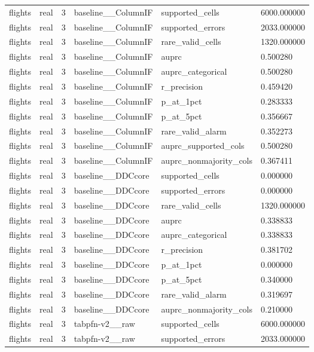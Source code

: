 \begin{tabular}{llllll}
flights & real & 3 & baseline\_\_ColumnIF & supported\_cells & 6000.000000 \\
flights & real & 3 & baseline\_\_ColumnIF & supported\_errors & 2033.000000 \\
flights & real & 3 & baseline\_\_ColumnIF & rare\_valid\_cells & 1320.000000 \\
flights & real & 3 & baseline\_\_ColumnIF & auprc & 0.500280 \\
flights & real & 3 & baseline\_\_ColumnIF & auprc\_categorical & 0.500280 \\
flights & real & 3 & baseline\_\_ColumnIF & r\_precision & 0.459420 \\
flights & real & 3 & baseline\_\_ColumnIF & p\_at\_1pct & 0.283333 \\
flights & real & 3 & baseline\_\_ColumnIF & p\_at\_5pct & 0.356667 \\
flights & real & 3 & baseline\_\_ColumnIF & rare\_valid\_alarm & 0.352273 \\
flights & real & 3 & baseline\_\_ColumnIF & auprc\_supported\_cols & 0.500280 \\
flights & real & 3 & baseline\_\_ColumnIF & auprc\_nonmajority\_cols & 0.367411 \\
flights & real & 3 & baseline\_\_DDCcore & supported\_cells & 0.000000 \\
flights & real & 3 & baseline\_\_DDCcore & supported\_errors & 0.000000 \\
flights & real & 3 & baseline\_\_DDCcore & rare\_valid\_cells & 1320.000000 \\
flights & real & 3 & baseline\_\_DDCcore & auprc & 0.338833 \\
flights & real & 3 & baseline\_\_DDCcore & auprc\_categorical & 0.338833 \\
flights & real & 3 & baseline\_\_DDCcore & r\_precision & 0.381702 \\
flights & real & 3 & baseline\_\_DDCcore & p\_at\_1pct & 0.000000 \\
flights & real & 3 & baseline\_\_DDCcore & p\_at\_5pct & 0.340000 \\
flights & real & 3 & baseline\_\_DDCcore & rare\_valid\_alarm & 0.319697 \\
flights & real & 3 & baseline\_\_DDCcore & auprc\_nonmajority\_cols & 0.210000 \\
flights & real & 3 & tabpfn-v2\_\_raw & supported\_cells & 6000.000000 \\
flights & real & 3 & tabpfn-v2\_\_raw & supported\_errors & 2033.000000 \\

\end{tabular}
